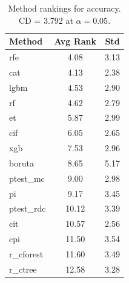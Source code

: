 \begin{table}[h]
\centering
\caption{Method rankings for accuracy. CD = 3.792 at $\alpha=0.05$.}
\label{tab:ranks_accuracy}
\begin{tabular}{lcc}
\toprule
Method & Avg Rank & Std \\
\midrule
rfe & 4.08 & 3.13 \\
cat & 4.13 & 2.38 \\
lgbm & 4.53 & 2.90 \\
rf & 4.62 & 2.79 \\
et & 5.87 & 2.99 \\
cif & 6.05 & 2.65 \\
xgb & 7.53 & 2.96 \\
boruta & 8.65 & 5.17 \\
ptest_mc & 9.00 & 2.98 \\
pi & 9.17 & 3.45 \\
ptest_rdc & 10.12 & 3.39 \\
cit & 10.57 & 2.56 \\
cpi & 11.50 & 3.54 \\
r_cforest & 11.60 & 3.49 \\
r_ctree & 12.58 & 3.28 \\
\bottomrule
\end{tabular}
\end{table}